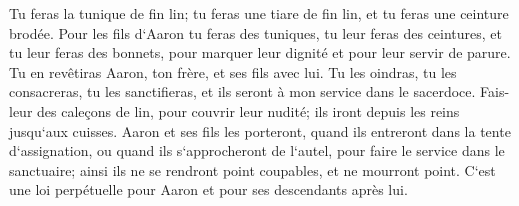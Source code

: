 \verse Tu feras la tunique de fin lin; tu feras une tiare de fin lin, et tu feras une ceinture brodée. 
\verse Pour les fils d`Aaron tu feras des tuniques, tu leur feras des ceintures, et tu leur feras des bonnets, pour marquer leur dignité et pour leur servir de parure. 
\verse Tu en revêtiras Aaron, ton frère, et ses fils avec lui. Tu les oindras, tu les consacreras, tu les sanctifieras, et ils seront à mon service dans le sacerdoce. 
\verse Fais-leur des caleçons de lin, pour couvrir leur nudité; ils iront depuis les reins jusqu`aux cuisses. 
\verse Aaron et ses fils les porteront, quand ils entreront dans la tente d`assignation, ou quand ils s`approcheront de l`autel, pour faire le service dans le sanctuaire; ainsi ils ne se rendront point coupables, et ne mourront point. C`est une loi perpétuelle pour Aaron et pour ses descendants après lui. 

